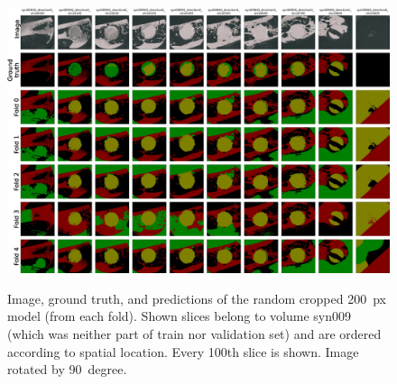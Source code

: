 \clearpage
\begin{figure}[!htb]
    \centering
    \includegraphics[clip,trim={0 0 0 7}, height=\textwidth, angle=90]{pictures/experiment_2/random_cropped_final_example_predictions_2_all_folds}\\
    \caption[Predictions with Random Cropped 200~px Regime]{Image, ground truth, and predictions of the random cropped 200~px model (from each fold).  Shown slices belong to volume syn009 (which was neither part of train nor validation set) and are ordered according to spatial location. Every 100th slice is shown. Image rotated by 90~degree.}
    \label{fig:random_cropped-predictions-syn009-by-fold}
\end{figure}

